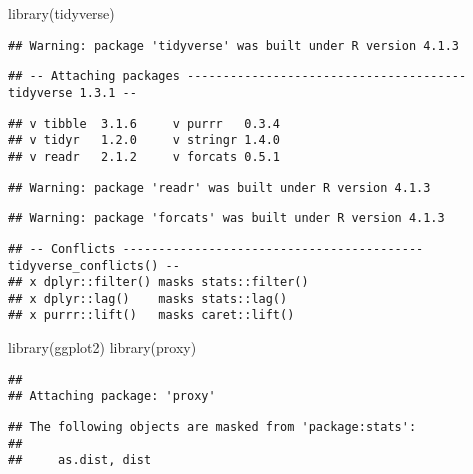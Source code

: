 \documentclass[
]{article}
\newenvironment{Shaded}{\begin{snugshade}}{\end{snugshade}}
\newcommand{\FunctionTok}[1]{\textcolor[rgb]{0.00,0.00,0.00}{#1}}
\newcommand{\NormalTok}[1]{#1}
\begin{document}
\begin{Shaded}
\begin{Highlighting}[]
\FunctionTok{library}\NormalTok{(tidyverse)}
\end{Highlighting}
\end{Shaded}

\begin{verbatim}
## Warning: package 'tidyverse' was built under R version 4.1.3
\end{verbatim}

\begin{verbatim}
## -- Attaching packages --------------------------------------- tidyverse 1.3.1 --
\end{verbatim}

\begin{verbatim}
## v tibble  3.1.6     v purrr   0.3.4
## v tidyr   1.2.0     v stringr 1.4.0
## v readr   2.1.2     v forcats 0.5.1
\end{verbatim}

\begin{verbatim}
## Warning: package 'readr' was built under R version 4.1.3
\end{verbatim}

\begin{verbatim}
## Warning: package 'forcats' was built under R version 4.1.3
\end{verbatim}

\begin{verbatim}
## -- Conflicts ------------------------------------------ tidyverse_conflicts() --
## x dplyr::filter() masks stats::filter()
## x dplyr::lag()    masks stats::lag()
## x purrr::lift()   masks caret::lift()
\end{verbatim}

\begin{Shaded}
\begin{Highlighting}[]
\FunctionTok{library}\NormalTok{(ggplot2)}
\FunctionTok{library}\NormalTok{(proxy)}
\end{Highlighting}
\end{Shaded}

\begin{verbatim}
## 
## Attaching package: 'proxy'
\end{verbatim}

\begin{verbatim}
## The following objects are masked from 'package:stats':
## 
##     as.dist, dist
\end{verbatim}
\end{document}
